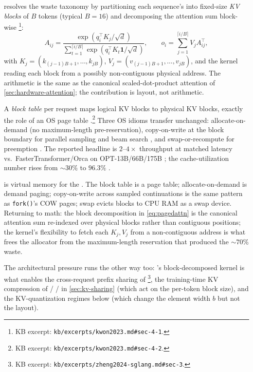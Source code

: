 \citet{kwon2023} resolves the waste taxonomy by partitioning each
sequence's  into fixed-size \emph{KV blocks} of $B$ tokens
(typical $B = 16$) and decomposing the attention sum block-wise
\citep[\S 4.1, Eq.~4]{kwon2023}\footnote{KB excerpt:
\texttt{kb/excerpts/kwon2023.md\#sec-4-1}.}:
\begin{equation}
A_{ij} = \frac{\exp(q_i^\top K_j / \sqrt{d})}{\sum_{t=1}^{\lceil i/B \rceil} \exp(q_i^\top K_t \mathbf{1} / \sqrt{d})}, \qquad
o_i = \sum_{j=1}^{\lceil i/B \rceil} V_j A_{ij}^\top,
\label{eq:pagedattn}
\end{equation}
with $K_j = (k_{(j-1)B+1}, \dots, k_{jB})$, $V_j = (v_{(j-1)B+1}, \dots, v_{jB})$,
and the kernel reading each block from a possibly non-contiguous
physical address. The arithmetic is the same as the canonical
scaled-dot-product attention of \cref{sec:hardware-attention}; the
contribution is layout, not arithmetic.

A \emph{block table} per request maps logical KV blocks to physical KV
blocks, exactly the role of an OS page table
\citep[\S 4.2]{kwon2023}.\footnote{KB excerpt:
\texttt{kb/excerpts/kwon2023.md\#sec-4-2}.} Three OS idioms transfer
unchanged: allocate-on-demand (no maximum-length pre-reservation),
copy-on-write at the block boundary for parallel sampling and beam
search \citep[\S 4.4]{kwon2023}, and swap-or-recompute for preemption
\citep[\S 4.5]{kwon2023}. The reported headline is $2$--$4\times$
throughput at matched latency vs.\ FasterTransformer/Orca on
OPT-13B/66B/175B \citep[abstract, \S 6.1]{kwon2023}; the cache-utilization
number rises from $\sim 30$\% to $96.3$\% \citep[\S 3, Fig.~2]{kwon2023}.

\begin{analogy}
 is virtual memory for the . The block table is
a page table; allocate-on-demand is demand paging; copy-on-write across
sampled continuations is the same pattern as \texttt{fork()}'s
COW pages; swap evicts blocks to CPU RAM as a swap device. Returning
to math: the block decomposition in \cref{eq:pagedattn} is the
canonical attention sum re-indexed over physical blocks rather than
contiguous positions; the kernel's flexibility to fetch each $K_j, V_j$
from a non-contiguous address is what frees the allocator from the
maximum-length reservation that produced the $\sim 70$\% waste.
\end{analogy}

The architectural pressure runs the other way too: 's
block-decomposed kernel is what enables the cross-request prefix sharing
of  \citep[\S 3]{zheng2024-sglang}\footnote{KB excerpt:
\texttt{kb/excerpts/zheng2024-sglang.md\#sec-3}.}, the
training-time KV compression of  /  /  in
\cref{sec:kv-sharing} (which act on the per-token block size), and the
KV-quantization regimes below (which change the element width $b$ but
not the layout).

